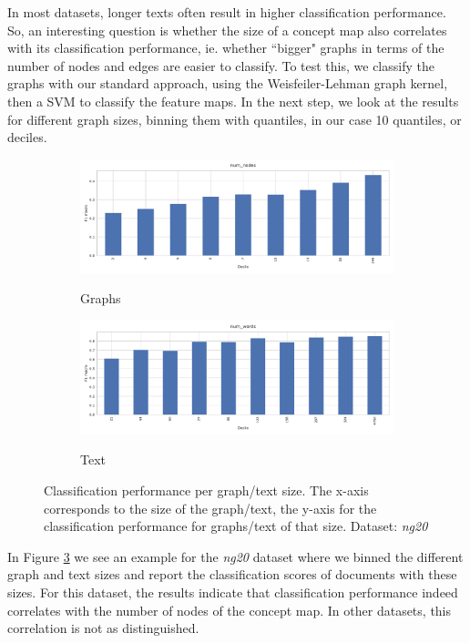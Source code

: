 In most datasets, longer texts often result in higher classification performance.
So, an interesting question is whether the size of a concept map also correlates with its classification performance, ie. whether ``bigger" graphs in terms of the number of nodes and edges are easier to classify.
To test this, we classify the graphs with our standard approach, using the Weisfeiler-Lehman graph kernel, then a SVM to classify the feature maps.
In the next step, we look at the results for different graph sizes, binning them with quantiles, in our case 10 quantiles, or deciles.

\begin{figure}[htb!]
	\begin{subfigure}[t]{.5\linewidth}	{\includegraphics[width=\linewidth]{assets/figures/graph_binning_num_nodes.pdf}\label{fig:todo_1}}
	\caption{Graphs}
	\end{subfigure}
	\hfill
		\begin{subfigure}[t]{.5\linewidth}
	{\includegraphics[width=\linewidth]{assets/figures/text_binning_num_words.pdf}\label{fig:todo_2}}
	\caption{Text}
	\end{subfigure}
	\caption{Classification performance per graph/text size. The x-axis corresponds to the size of the graph/text, the y-axis for the classification performance for graphs/text of that size. Dataset: \textit{ng20}}\label{fig:graph_size_performance}
\end{figure}

In Figure \ref{fig:graph_size_performance} we see an example for the \textit{ng20} dataset where we binned the different graph and text sizes and report the classification scores of documents with these sizes.
For this dataset, the results indicate that classification performance indeed correlates with the number of nodes of the concept map.
In other datasets, this correlation is not as distinguished.

